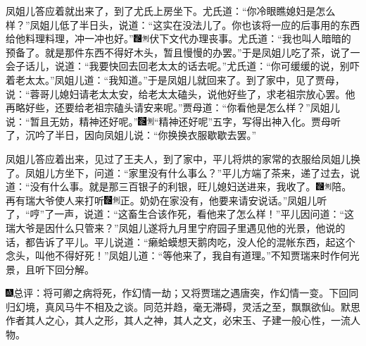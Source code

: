 凤姐儿答应着就出来了，到了尤氏上房坐下。尤氏道：``你冷眼瞧媳妇是怎么样？''凤姐儿低了半日头，说道：``这实在没法儿了。你也该将一应的后事用的东西给他料理料理，冲一冲也好。''{\includegraphics[width=3mm]{../Images/00006}\includegraphics[width=3mm]{../Images/00011}\footnotesize \kaishu 伏下文代办理丧事。}尤氏道：``我也叫人暗暗的预备了。就是那件东西不得好木头，暂且慢慢的办罢。''于是凤姐儿吃了茶，说了一会子话儿，说道：``我要快回去回老太太的话去呢。''尤氏道：``你可缓缓的说，别吓着老太太。''凤姐儿道：``我知道。''于是凤姐儿就回来了。到了家中，见了贾母，说：``蓉哥儿媳妇请老太太安，给老太太磕头，说他好些了，求老祖宗放心罢。他再略好些，还要给老祖宗磕头请安来呢。''贾母道：``你看他是怎么样？''凤姐儿说：``暂且无妨，精神还好呢。''{\includegraphics[width=3mm]{../Images/00006}\includegraphics[width=3mm]{../Images/00011}\footnotesize \kaishu ``精神还好呢''五字，写得出神入化。}贾母听了，沉吟了半日，因向凤姐儿说：``你换换衣服歇歇去罢。''

凤姐儿答应着出来，见过了王夫人，到了家中，平儿将烘的家常的衣服给凤姐儿换了。凤姐儿方坐下，问道：``家里没有什么事么？''平儿方端了茶来，递了过去，说道：``没有什么事。就是那三百银子的利银，旺儿媳妇送进来，我收了。{\includegraphics[width=3mm]{../Images/00006}\includegraphics[width=3mm]{../Images/00011}\footnotesize \kaishu 陪。}再有瑞大爷使人来打听{\includegraphics[width=3mm]{../Images/00006}\includegraphics[width=3mm]{../Images/00011}\footnotesize \kaishu 正。}奶奶在家没有，他要来请安说话。''凤姐儿听了，``哼''了一声，说道：``这畜生合该作死，看他来了怎么样！''平儿因问道：``这瑞大爷是因什么只管来？''凤姐儿遂将九月里宁府园子里遇见他的光景，他说的话，都告诉了平儿。平儿说道：``癞蛤蟆想天鹅肉吃，没人伦的混帐东西，起这个念头，叫他不得好死！''凤姐儿道：``等他来了，我自有道理。''不知贾瑞来时作何光景，且听下回分解。

{\includegraphics[width=3mm]{../Images/00005}总评：将可卿之病将死，作幻情一劫；又将贾瑞之遇唐突，作幻情一变。下回同归幻境，真风马牛不相及之谈。同范并趋，毫无滞碍，灵活之至，飘飘欲仙。默思作者其人之心，其人之形，其人之神，其人之文，必宋玉、子建一般心性，一流人物。}
